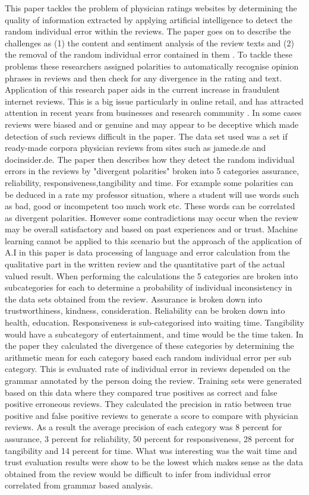\documentclass[12pt]{article} %
\begin{document}
This paper tackles the problem of physician ratings websites by determining the quality of information extracted by applying artificial intelligence to detect the random individual error within the reviews. The paper goes on to describe the challenges as (1) the content and sentiment analysis of the review texts and (2) the removal of the random individual error contained in them \cite{Geierhos}. To tackle these problems these researchers assigned polarities to automatically recognise opinion phrases in reviews and then check for any divergence in the rating and text. Application of this research paper aids in the current increase in fraudulent internet reviews. This is a big issue particularly in online retail, and has attracted attention in recent years from businesses and research community \cite{Mukherjee}. In some cases reviews were biased and or genuine and may appear to be deceptive which made detection of such reviews difficult in the paper. The data set used was a set if ready-made corpora physician reviews from sites such as jamede.de and docinsider.de. The paper then describes how they detect the random individual errors in the reviews by "divergent polarities" broken into 5 categories assurance, reliability, responsiveness,tangibility and time. For example some polarities can be deduced in a rate my professor situation, where a student will use words such as bad, good or incompetent too much work etc. These words can be correlated as divergent polarities. However some contradictions may occur when the review may be overall satisfactory and based on past experiences and or trust. Machine learning cannot be applied to this scenario but the approach of the application of A.I in this paper is data processing of language and error calculation from the qualitative part in the written review and the quantitative part of the actual valued result. When performing the calculations the 5 categories are broken into subcategories for each to determine a probability of individual inconsistency in the data sets obtained from the review. Assurance is broken down into trustworthiness, kindness, consideration. Reliability can be broken down into health, education. Responsiveness is sub-categorised into waiting time. Tangibility would have a subcategory of entertainment, and time would be the time taken. In the paper they calculated the divergence of these categories by determining the arithmetic mean for each category based each random individual error per sub category. This is evaluated rate of individual error in reviews depended on the grammar annotated by the person doing the review. Training sets were generated based on this data where they compared true positives as correct and false positive erroneous reviews. They calculated the precision in ratio between true positive and false positive reviews to generate a score to compare with physician reviews. As a result the average precision of each category  was 8 percent for assurance, 3 percent for reliability, 50 percent for responsiveness, 28 percent for tangibility and 14 percent for time. What was interesting was the wait time and trust evaluation results were show to be the lowest which makes sense as the data obtained from the review would be difficult to infer from individual error correlated from grammar based analysis.
\end{document}
